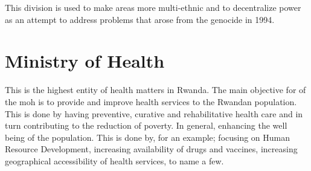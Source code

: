 This division is used to make areas more multi-ethnic and to decentralize power as an attempt to address problems that arose from the genocide in 1994.

\section{Ministry of Health}
This is the highest entity of health matters in Rwanda.
The main objective for of the \gls{moh} is to provide and improve health services to the Rwandan population.
This is done by having preventive, curative and rehabilitative health care and in turn contributing to the reduction of poverty.
In general, enhancing the well being of the population. 
This is done by, for an example; focusing on Human Resource Development, increasing availability of drugs and vaccines, increasing geographical accessibility of health services, to name a few.
%

\cite{moh:rw}
